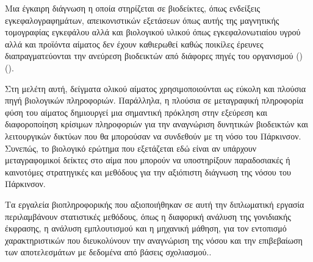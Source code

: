 \documentclass[12pt]{report}
\begin{document}
    \par
        Μια έγκαιρη διάγνωση η οποία στηρίζεται σε βιοδείκτες, όπως ενδείξεις εγκεφαλογραφημάτων, απεικονιστικών εξετάσεων όπως αυτής της μαγνητικής τομογραφίας εγκεφάλου αλλά και βιολογικού υλικού όπως εγκεφαλονωτιαίου υγρού αλλά και προϊόντα αίματος δεν έχουν καθιερωθεί καθώς ποικίλες έρευνες διαπραγματεύονται την ανεύρεση βιοδεικτών από διάφορες πηγές του οργανισμού (\emph{\cite{Miller2015BiomarkersFuture}}) (\emph{\cite{Maitin2022SurveyReview}}).
    \par
        Στη μελέτη αυτή, δείγματα ολικού αίματος χρησιμοποιούνται ως εύκολη και πλούσια πηγή βιολογικών πληροφοριών. Παράλληλα, η πλούσια σε μεταγραφική πληροφορία φύση του αίματος δημιουργεί μια σημαντική πρόκληση στην εξεύρεση και διαφοροποίηση κρίσιμων πληροφοριών για την αναγνώριση δυνητικών βιοδεικτών και λειτουργικών δικτύων που θα μπορούσαν να συνδεθούν με τη νόσο του Πάρκινσον. Συνεπώς, το βιολογικό ερώτημα που εξετάζεται εδώ είναι αν υπάρχουν μεταγραφομικοί δείκτες στο αίμα που μπορούν να υποστηρίξουν παραδοσιακές ή καινοτόμες στρατηγικές και μεθόδους για την αξιόπιστη διάγνωση της νόσου του Πάρκινσον.
    \par
        Τα εργαλεία βιοπληροφορικής που αξιοποιήθηκαν σε αυτή την διπλωματική εργασία περιλαμβάνουν στατιστικές μεθόδους, όπως η διαφορική ανάλυση της γονιδιακής έκφρασης, η ανάλυση εμπλουτισμού και η μηχανική μάθηση, για τον εντοπισμό χαρακτηριστικών που διευκολύνουν την αναγνώριση της νόσου και την επιβεβαίωση των αποτελεσμάτων με δεδομένα από βάσεις σχολιασμού..
        
    \cleardoublepage
\end{document}
